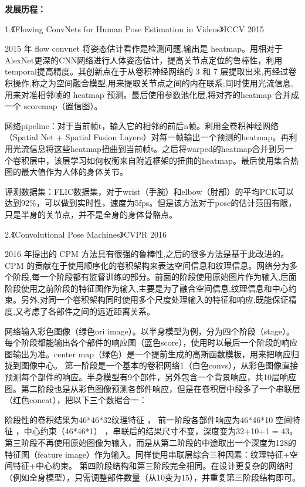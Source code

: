 \documentclass[11pt]{article}
\begin{document}
\textbf{发展历程：}

1.《Flowing ConvNets for Human Pose Estimation in Videos》ICCV 2015

2015 年 flow convnet 将姿态估计看作是检测问题,输出是 heatmap。用相对于AlexNet更深的CNN网络进行人体姿态估计，提高关节点定位的鲁棒性，利用temporal提高精度。其创新点在于从卷积神经网络的 3 和 7 层提取出来,再经过卷积操作,称之为空间融合模型,用来提取关节点之间的内在联系;同时使用光流信息,用来对准相邻帧的 heatmap 预测。最后使用参数池化层,将对齐的heatmap 合并成一个 scoremap（置信图）。

网络pipeline：对于当前帧t，输入它的相邻的前后n帧。利用全卷积神经网络（Spatial Net + Spatial Fusion Layers）对每一帧输出一个预测的heatmap。再利用光流信息将这些heatmap扭曲到当前帧t。之后将warped的heatmap合并到另一个卷积层中，该层学习如何权衡来自附近框架的扭曲的heatmap。最后使用集合热图的最大值作为人体的身体关节。

评测数据集：FLIC数据集，对于wrist（手腕）和elbow（肘部）的平均PCK可以达到92\%，可以做到实时性，速度为5fps。但是该方法对于pose的估计范围有限，只是半身的关节点，并不是全身的身体骨骼点。

2.《Convolutional Pose Machines》CVPR 2016

2016 年提出的 CPM 方法具有很强的鲁棒性,之后的很多方法是基于此改进的。CPM 的贡献在于使用顺序化的卷积架构来表达空间信息和纹理信息。网络分为多个阶段,每一个阶段都有监督训练的部分。前面的阶段使用原始图片作为输入,后面阶段使用之前阶段的特征图作为输入,主要是为了融合空间信息,纹理信息和中心约束。另外,对同一个卷积架构同时使用多个尺度处理输入的特征和响应,既能保证精度,又考虑了各部件之间的远近距离关系。

网络输入彩色图像（绿色ori image）。以半身模型为例，分为四个阶段（stage）。每个阶段都能输出各个部件的响应图（蓝色score），使用时以最后一个阶段的响应图输出为准。center map（绿色）是一个提前生成的高斯函数模板，用来把响应归拢到图像中心。 第一阶段是一个基本的卷积网络1（白色convs），从彩色图像直接预测每个部件的响应。半身模型有9个部件，另外包含一个背景响应，共10层响应图。第二阶段也是从彩色图像预测各部件响应，但是在卷积层中段多了一个串联层（红色concat），把以下三个数据合一：

阶段性的卷积结果为46*46*32纹理特征 ， 前一阶段各部件响应为46*46*10 空间特征 ，中心约束（46*46*1） ，串联后的结果尺寸不变，深度变为32+10+1 = 43。第三阶段不再使用原始图像为输入，而是从第二阶段的中途取出一个深度为128的特征图（feature image）作为输入。同样使用串联层综合三种因素：纹理特征+空间特征+中心约束。 第四阶段结构和第三阶段完全相同。在设计更复杂的网络时（例如全身模型），只需调整部件数量（从10变为15），并重复第三阶段结构即可。
\end{document}
